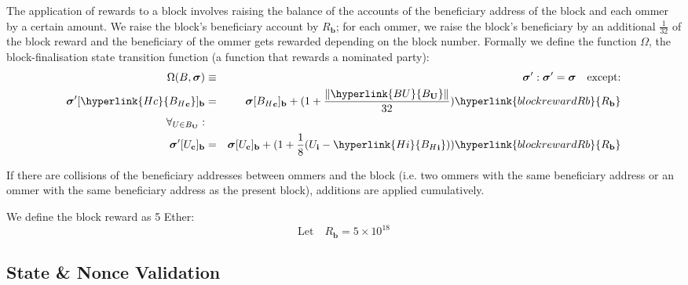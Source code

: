 \documentclass[9pt,oneside]{amsart}
\begin{document}
\begin{multicols}{2}
The application of rewards to a block involves raising the balance of the accounts of the beneficiary address of the block and each ommer by a certain amount. We raise the block's beneficiary account by \hyperlink{block reward R b}{$R_\mathbf{b}$}; for each ommer, we raise the block's beneficiary by an additional $\frac{1}{32}$ of the block reward and the beneficiary of the ommer gets rewarded depending on the block number. \hypertarget{Omega}{Formally we define the function $\Omega$, the block-finalisation state transition function (a function that rewards a nominated party):}
\begin{eqnarray}
\Omega(B, \boldsymbol{\sigma}) & \equiv & \boldsymbol{\sigma}': \boldsymbol{\sigma}' = \boldsymbol{\sigma} \quad \text{except:} \\
\boldsymbol{\sigma}'[\hyperlink{H c}{{B_H}_\mathbf{c}}]_\mathbf{b} & = & \boldsymbol{\sigma}[{B_H}_\mathbf{c}]_\mathbf{b} + (1 + \frac{\lVert \hyperlink{B U}{B_\mathbf{U}}\rVert}{32})\hyperlink{block reward R b}{R_\mathbf{b}} \\
\forall_{U \in B_\mathbf{U}}: \\ \nonumber
 \boldsymbol{\sigma}'[U_\mathbf{c}]_\mathbf{b} & = & \boldsymbol{\sigma}[U_\mathbf{c}]_\mathbf{b} + (1 + \frac{1}{8} (U_\mathbf{i} - \hyperlink{H i}{{B_H}_\mathbf{i}})) \hyperlink{block reward R b}{R_\mathbf{b}}
\end{eqnarray}

If there are collisions of the beneficiary addresses between ommers and the block (i.e. two ommers with the same beneficiary address or an ommer with the same beneficiary address as the present block), additions are applied cumulatively.\hypertarget{block reward R b}{}

We define the block reward as 5 Ether:
\begin{equation}
\text{Let} \quad R_\mathbf{b} = 5 \times 10^{18}
\end{equation}

\subsection{State \& Nonce Validation}\label{sec:statenoncevalidation}


\end{multicols}
\end{document}
